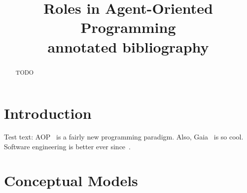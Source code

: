 \documentclass{article}
\title{Roles in Agent-Oriented Programming\\[1ex]\small{annotated bibliography}}
\begin{document}
\maketitle

\begin{abstract}
TODO
\end{abstract}

\section{Introduction}

Test text:
AOP~\cite{journals/ai/Shoham93} is a fairly new programming paradigm.
Also, Gaia~\cite{journals/aamas/WooldridgeJK00} is so cool.
Software engineering is better ever since~\cite{conf/aose/WooldridgeC00}.

\section{Conceptual Models}



\end{document}
